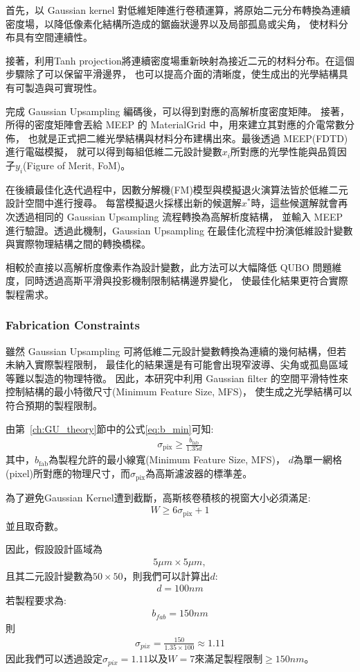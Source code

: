 首先，以 Gaussian kernel 對低維矩陣進行卷積運算，將原始二元分布轉換為連續密度場，以降低像素化結構所造成的鋸齒狀邊界以及局部孤島或尖角，
使材料分布具有空間連續性。

接著，利用Tanh projection將連續密度場重新映射為接近二元的材料分布。在這個步驟除了可以保留平滑邊界，
也可以提高介面的清晰度，使生成出的光學結構具有可製造與可實現性。

完成 Gaussian Upsampling 編碼後，可以得到對應的高解析度密度矩陣。
接著，所得的密度矩陣會丟給 MEEP 的 MaterialGrid 中，用來建立其對應的介電常數分佈，
也就是正式把二維光學結構與材料分布建構出來。最後透過 MEEP(FDTD) 進行電磁模擬，
就可以得到每組低維二元設計變數$x_i$所對應的光學性能與品質因子$y_i$(Figure of Merit, FoM)。

在後續最佳化迭代過程中，因數分解機(FM)模型與模擬退火演算法皆於低維二元設計空間中進行搜尋。
每當模擬退火採樣出新的候選解$x^*$時，這些候選解就會再次透過相同的 Gaussian Upsampling 流程轉換為高解析度結構，
並輸入 MEEP 進行驗證。透過此機制，Gaussian Upsampling 在最佳化流程中扮演低維設計變數與實際物理結構之間的轉換橋樑。

相較於直接以高解析度像素作為設計變數，此方法可以大幅降低 QUBO 問題維度，同時透過高斯平滑與投影機制限制結構邊界變化，
使最佳化結果更符合實際製程需求。

\subsubsection{Fabrication Constraints}
雖然 Gaussian Upsampling 可將低維二元設計變數轉換為連續的幾何結構，但若未納入實際製程限制，
最佳化的結果還是有可能會出現窄波導、尖角或孤島區域等難以製造的物理特徵。
因此，本研究中利用 Gaussian filter 的空間平滑特性來控制結構的最小特徵尺寸(Minimum Feature Size, MFS)，
使生成之光學結構可以符合預期的製程限制。

由第~\ref{ch:GU_theory}節中的公式\eqref{eq:b_min}可知:
\begin{align}
\sigma_{\text{pix}} \ge \frac{b_{\text{fab}}}{1.35d}
\label{eq:sigma_pix_min}
\end{align}
其中，$b_{\text{fab}}$為製程允許的最小線寬(Minimum Feature Size, MFS)，
$d$為單一網格(pixel)所對應的物理尺寸，而$\sigma_{\text{pix}}$為高斯濾波器的標準差。

為了避免Gaussian Kernel遭到截斷，高斯核卷積核的視窗大小必須滿足:
\begin{align}
W \ge 6\sigma_{\text{pix}} + 1
\label{eq:gaussian_kernel_size}
\end{align}
並且取奇數。

因此，假設設計區域為
\begin{align}
5 \mu m \times 5 \mu m,
\end{align}
且其二元設計變數為$50 \times 50$，則我們可以計算出$d$:
\begin{align}
d = 100 nm
\end{align}
若製程要求為:
\begin{align}
b_{fab} = 150 nm
\end{align}
則
\begin{align}
\sigma_{pix} = \frac{150}{1.35 \times 100} \approx 1.11
\end{align}
因此我們可以透過設定$\sigma_{pix}=1.11$以及$W=7$來滿足製程限制$\ge 150 nm$。

